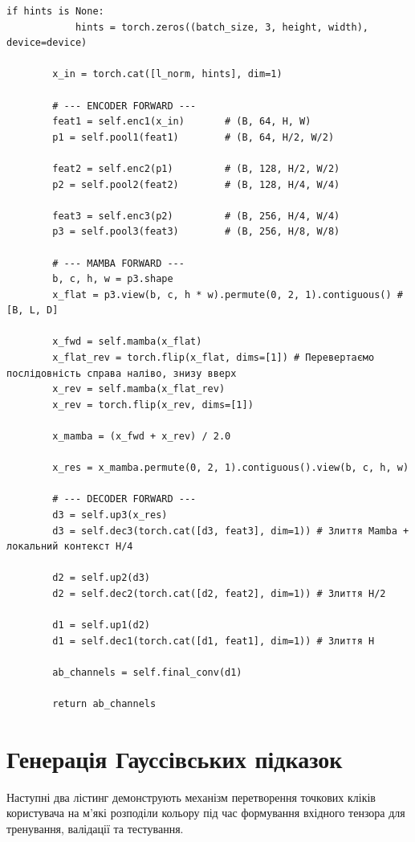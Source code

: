\begin{lstlisting}[caption={Клас модуля MambaWrapper (PyTorch)}]
        if hints is None:
            hints = torch.zeros((batch_size, 3, height, width), device=device)

        x_in = torch.cat([l_norm, hints], dim=1)
        
        # --- ENCODER FORWARD ---
        feat1 = self.enc1(x_in)       # (B, 64, H, W)
        p1 = self.pool1(feat1)        # (B, 64, H/2, W/2)
        
        feat2 = self.enc2(p1)         # (B, 128, H/2, W/2)
        p2 = self.pool2(feat2)        # (B, 128, H/4, W/4)
        
        feat3 = self.enc3(p2)         # (B, 256, H/4, W/4)
        p3 = self.pool3(feat3)        # (B, 256, H/8, W/8)
        
        # --- MAMBA FORWARD ---
        b, c, h, w = p3.shape
        x_flat = p3.view(b, c, h * w).permute(0, 2, 1).contiguous() # [B, L, D]
    
        x_fwd = self.mamba(x_flat)
        x_flat_rev = torch.flip(x_flat, dims=[1]) # Перевертаємо послідовність справа наліво, знизу вверх
        x_rev = self.mamba(x_flat_rev)
        x_rev = torch.flip(x_rev, dims=[1])

        x_mamba = (x_fwd + x_rev) / 2.0

        x_res = x_mamba.permute(0, 2, 1).contiguous().view(b, c, h, w)
        
        # --- DECODER FORWARD ---
        d3 = self.up3(x_res)
        d3 = self.dec3(torch.cat([d3, feat3], dim=1)) # Злиття Mamba + локальний контекст H/4
        
        d2 = self.up2(d3)
        d2 = self.dec2(torch.cat([d2, feat2], dim=1)) # Злиття H/2
        
        d1 = self.up1(d2)
        d1 = self.dec1(torch.cat([d1, feat1], dim=1)) # Злиття H
        
        ab_channels = self.final_conv(d1)
        
        return ab_channels
\end{lstlisting}

\section{Генерація Гауссівських підказок}

Наступні два лістинг демонструють механізм перетворення точкових кліків користувача на м'які розподіли кольору під час формування вхідного тензора для тренування, валідації та тестування.

